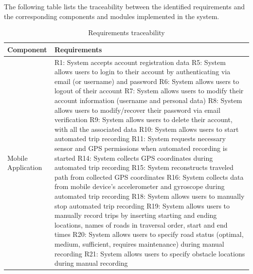 The following table lists the traceability between the identified requirements and the corresponding components and modules implemented in the system.

\enlargethispage{2cm}

\begin{longtable}{|p{3cm}|p{13cm}|}
    
    \caption[]{Requirements traceability} \\
    \hline
    \textbf{Component} & \textbf{Requirements} \\ \hline
    \endhead
   Mobile \newline Application & 
   R1: System accepts account registration data \newline
   R5: System allows users to login to their account by authenticating via email (or username) and password \newline
   R6: System allows users to logout of their account \newline
   R7: System allows users to modify their account information (username and personal data) \newline
   R8: System allows users to modify/recover their password via email verification \newline
   R9: System allows users to delete their account, with all the associated data \newline
   R10: System allows users to start automated trip recording \newline
   R11: System requests necessary sensor and GPS permissions when automated recording is started \newline
   R14: System collects GPS coordinates during automated trip recording \newline
   R15: System reconstructs traveled path from collected GPS coordinates \newline
   R16: System collects data from mobile device’s accelerometer and gyroscope during automated trip recording \newline
   R18: System allows users to manually stop automated trip recording \newline
   R19: System allows users to manually record trips by inserting starting and ending locations, names of roads in traversal order, start and end times \newline
   R20: System allows users to specify road status (optimal, medium, sufficient, requires maintenance) during manual recording \newline
   R21: System allows users to specify obstacle locations during manual recording \newline

\end{longtable}
